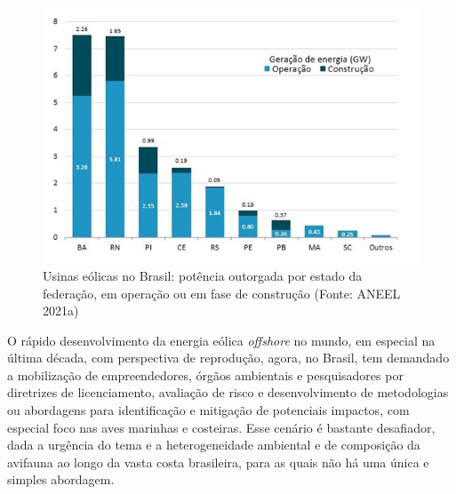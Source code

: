 \documentclass[
  oneside]{scrbook}
\begin{document}
\begin{figure}[H]

{\centering \includegraphics[width=0.65\linewidth]{imagens/cap08/Figura_8.3} 

}

\caption{Usinas eólicas no Brasil: potência outorgada por estado da federação, em operação ou em fase de construção (Fonte: ANEEL 2021a)}\label{fig:63}
\end{figure}

O rápido desenvolvimento da energia eólica \emph{offshore} no mundo, em especial na última década, com perspectiva de reprodução, agora, no Brasil, tem demandado a mobilização de empreendedores, órgãos ambientais e pesquisadores por diretrizes de licenciamento, avaliação de risco e desenvolvimento de metodologias ou abordagens para identificação e mitigação de potenciais impactos, com especial foco nas aves marinhas e costeiras. Esse cenário é bastante desafiador, dada a urgência do tema e a heterogeneidade ambiental e de composição da avifauna ao longo da vasta costa brasileira, para as quais não há uma única e simples abordagem.
\end{document}
